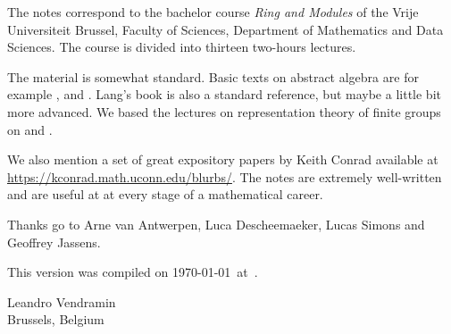 \preface

The notes correspond to the bachelor 
course \emph{Ring and Modules} of the 
Vrije Universiteit Brussel, 
Faculty of Sciences, 
Department of Mathematics and Data Sciences. The course
is divided into thirteen two-hours lectures. 

The material is somewhat standard. Basic texts on abstract algebra
are for example \cite{MR1129886}, \cite{MR2286236} and \cite{MR600654}. 
Lang's book \cite{MR783636} is also a standard reference, but 
maybe a little bit more advanced. 
We based the lectures on representation theory of finite
groups on \cite{MR0450380} and 
\cite{MR2867444}. 

We also mention a set of great expository papers by 
Keith Conrad available at 
\url{https://kconrad.math.uconn.edu/blurbs/}. 
The notes are extremely well-written and are useful at  
at every stage of a mathematical career. 
 
Thanks go to Arne van Antwerpen, Luca Descheemaeker, Lucas Simons
and Geoffrey Jassens. 

This version 
was compiled on \today~at~\currenttime.

\bigskip
\begin{flushright}
Leandro Vendramin\\Brussels, Belgium\par
\end{flushright}
